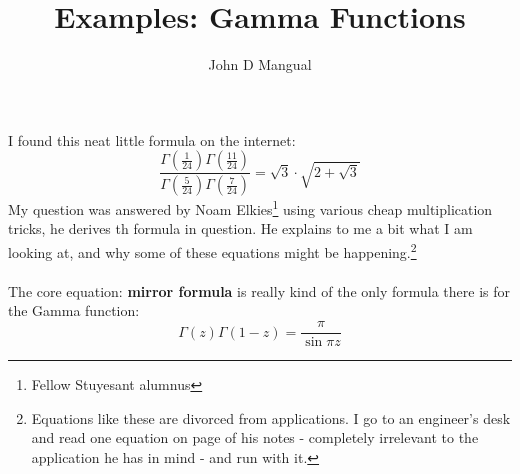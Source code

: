 \documentclass[12pt]{article}
\title{\textbf{ Examples:  Gamma Functions}}
\author{John D Mangual}
\date{}
\begin{document}
\selectfont \fontsize{25}{30}\selectfont

\maketitle

\noindent  I found this neat little formula on the internet:
$$ \frac{\Gamma(\frac{1}{24})\Gamma(\frac{11}{24})}
{\Gamma(\frac{5}{24})\Gamma(\frac{7}{24})}
= \sqrt{3} \cdot \sqrt{2 + \sqrt{3}} $$
My question was answered by Noam Elkies\footnote{Fellow Stuyesant alumnus} using various cheap multiplication tricks, he derives th formula in question.  He explains to me a bit what I am looking at, and why some of these equations might be happening.\footnote{Equations like these are divorced from applications.  I go to an engineer's desk and read one equation on page of his notes - completely irrelevant to the application he has in mind - and run with it.}\\ \\
The core equation: \textbf{mirror formula} is really kind of the only formula there is for the Gamma function:
$$ \Gamma(z) \Gamma(1-z) = \frac{\pi}{\sin \pi z}$$
\newpage
\end{document}
